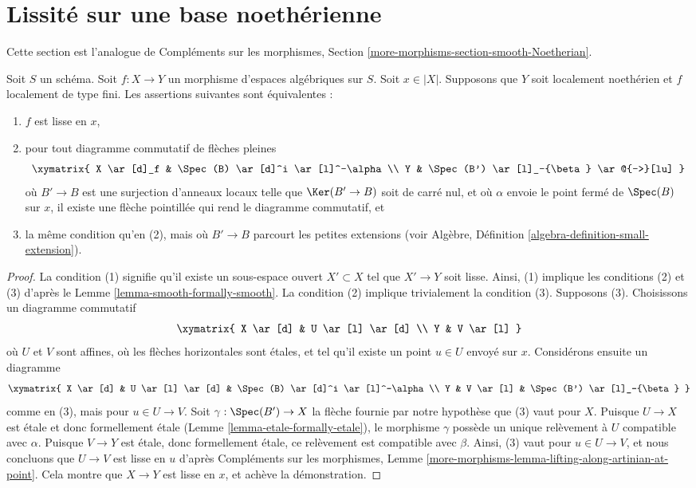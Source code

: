 \section{Lissité sur une base noethérienne}
\label{section-smooth-Noetherian}

\noindent
Cette section est l'analogue de
Compléments sur les morphismes, Section \ref{more-morphisms-section-smooth-Noetherian}.

\begin{lemma}
\label{lemma-lifting-along-artinian-at-point}
Soit $S$ un schéma. Soit $f : X \to Y$ un morphisme d'espaces algébriques
sur $S$. Soit $x \in |X|$.
Supposons que $Y$ soit localement noethérien et $f$ localement de type fini.
Les assertions suivantes sont équivalentes :
\begin{enumerate}
\item $f$ est lisse en $x$,
\item pour tout diagramme commutatif de flèches pleines
$$
\xymatrix{
X \ar[d]_f & \Spec(B) \ar[d]^i \ar[l]^-\alpha \\
Y & \Spec(B') \ar[l]_-{\beta} \ar@{-->}[lu]
}
$$
où $B' \to B$ est une surjection d'anneaux locaux telle que
$\Ker(B' \to B)$ soit de carré nul, et où $\alpha$ envoie le
point fermé de $\Spec(B)$ sur $x$, il existe
une flèche pointillée qui rend le diagramme commutatif, et
\item la même condition qu'en (2), mais où $B' \to B$ parcourt les petites
extensions (voir Algèbre, Définition \ref{algebra-definition-small-extension}).
\end{enumerate}
\end{lemma}

\begin{proof}
La condition (1) signifie qu'il existe un sous-espace ouvert $X' \subset X$
tel que $X' \to Y$ soit lisse. Ainsi, (1) implique les conditions (2) et (3) d'après le
Lemme \ref{lemma-smooth-formally-smooth}. La condition (2) implique
trivialement la condition (3). Supposons (3). Choisissons un diagramme commutatif
$$
\xymatrix{
X \ar[d] & U \ar[l] \ar[d] \\
Y & V \ar[l]
}
$$
où $U$ et $V$ sont affines, où les flèches horizontales sont étales, et
tel qu'il existe un point $u \in U$ envoyé sur $x$. Considérons ensuite
un diagramme
$$
\xymatrix{
X \ar[d] & U \ar[l] \ar[d] & \Spec(B) \ar[d]^i \ar[l]^-\alpha  \\
Y & V \ar[l] & \Spec(B') \ar[l]_-{\beta}
}
$$
comme en (3), mais pour $u \in U \to V$. Soit $\gamma : \Spec(B') \to X$
la flèche fournie par notre hypothèse que (3) vaut pour $X$.
Puisque $U \to X$ est étale et
donc formellement étale (Lemme \ref{lemma-etale-formally-etale}),
le morphisme $\gamma$
possède un unique relèvement à $U$ compatible avec $\alpha$. Puisque
$V \to Y$ est étale, donc formellement étale, ce relèvement est compatible
avec $\beta$. Ainsi, (3) vaut pour $u \in U \to V$, et nous concluons
que $U \to V$ est lisse en $u$ d'après
Compléments sur les morphismes, Lemme
\ref{more-morphisms-lemma-lifting-along-artinian-at-point}.
Cela montre que $X \to Y$ est lisse en $x$, et
achève la démonstration.
\end{proof}

